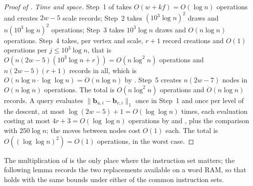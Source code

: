 \documentclass[11pt]{article}
\theoremstyle{remark}
\newcommand{\norm}[1]{\lVert#1\rVert}
\newcommand{\Odouble}{\ddot{O}}
\newcommand{\bb}{\mathbf b}
\begin{document}
\begin{proof}[Proof of ]
\emph{Time and space.}
Step~1 of  takes $O(w+kf)=O(\log n)$ operations and
creates $2w-5$ scale records; Step~2 takes $(10^{3}\log n)^{2}$ draws and
$n(10^{3}\log n)^{2}$ operations; Step~3 takes $10^{3}\log n$ draws and
$O(n\log n)$ operations.
Step~4 takes, per vertex and scale, $r+1$ record creations and $O(1)$
operations per $j\le10^{3}\log n$, that is
$O(n(2w-5)(10^{3}\log n+r))=O(n\log^{2}n)$ operations and $n(2w-5)(r+1)$
records in all, which is $O(n\log n\cdot\log\log n)=\Odouble(n\log n)$ by
.
Step~5 creates $n(2w-7)$ nodes in $O(n\log n)$ operations.
The total is $O(n\log^{2}n)$ operations and $\Odouble(n\log n)$ records.
A query evaluates $\norm{\bb_{u,i}-\bb_{v,i}}_1$ once in Step~1 and once per
level of the descent, at most $\log(2w-5)+1=O(\log\log n)$ times, each
evaluation costing at most $4r+3=O(\log\log n)$ operations by
 and , plus the comparison
with $250\log n$; the moves between nodes cost $O(1)$ each.
The total is $O((\log\log n)^{2})=\Odouble(1)$ operations, in the worst case.
\end{proof}

The multiplication of  is the only place where
the instruction set matters; the following lemma records the two
replacements available on a word RAM, so that  holds
with the same bounds under either of the common instruction sets.
\end{document}
